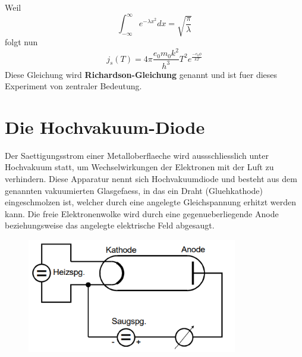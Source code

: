 Weil 
\begin{equation}
    \int_{-\infty}^{\infty}e^{-\lambda x^2}dx=\sqrt{\frac{\pi}{\lambda}}\nonumber
\end{equation}
folgt nun
\begin{equation}
    j_s(T)=4\pi\frac{e_0m_0k^2}{h^3}T^2e^{\frac{-e_0\phi}{kT}} \label{7}
\end{equation}
Diese Gleichung wird \textbf{Richardson-Gleichung} genannt und ist fuer dieses Experiment von zentraler Bedeutung.
\section{Die Hochvakuum-Diode}
Der Saettigungsstrom einer Metalloberflaeche wird aussschliesslich unter Hochvakuum statt, um Wechselwirkungen der Elektronen mit der Luft zu verhindern. Diese Apparatur nennt sich Hochvakuumdiode und besteht aus dem genannten vakuumierten Glasgefaess, in das ein Draht (Gluehkathode) eingeschmolzen ist, welcher durch eine angelegte Gleichspannung erhitzt werden kann. Die freie Elektronenwolke wird durch eine gegenueberliegende Anode beziehungsweise das angelegte elektrische Feld abgesaugt. 
\begin{figure}[H]
    \centering
    \captionsetup{justification=centering}
    \includegraphics[height=5cm]{"Schema_emission.png"}
    \label{Fig:Schema}
\end{figure}
